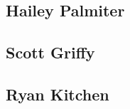 \documentclass[letterpaper, onecolumn,10pt,draftclsnofoot]{IEEEtran}
\begin{document}
	\subsection{Hailey Palmiter}
		
	\subsection{Scott Griffy}
		
	\subsection{Ryan Kitchen}
		
		





   
\end{document}
